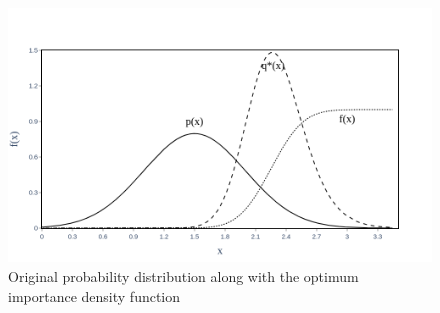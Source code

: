     \begin{figure}[H]
        \centering
        \includegraphics[scale=0.30]{Figures/Images/Illustrative Example/opt_IS_dist.png}
        \caption{Original probability distribution along with the optimum importance density function}
        \label{fig:opt_IS_dist}
    \end{figure}
